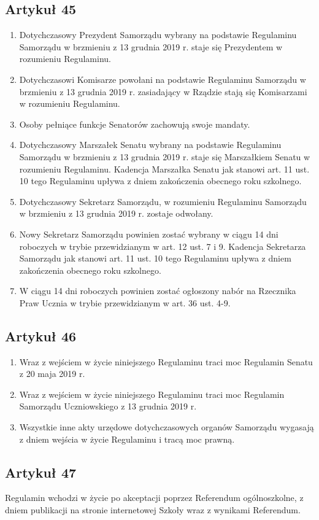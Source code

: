 \documentclass[14pt]{article}
\newenvironment{ustepy}{%
	\begin{enumerate}[leftmargin=1.5em, itemindent=1pt, labelwidth=1em, itemsep=5pt]
	}{%
	\end{enumerate}
}
\begin{document}
\subsection*{Artykuł 45}
\begin{ustepy}
	\item Dotychczasowy Prezydent Samorządu wybrany na podstawie Regulaminu Samorządu w brzmieniu z 13 grudnia 2019 r. staje się Prezydentem w rozumieniu Regulaminu.
	\item Dotychczasowi Komisarze powołani na podstawie Regulaminu Samorządu w brzmieniu z 13 grudnia 2019 r. zasiadający w Rządzie stają się Komisarzami w rozumieniu Regulaminu.
	\item Osoby pełniące funkcje Senatorów zachowują swoje mandaty.
	\item Dotychczasowy Marszałek Senatu wybrany na podstawie Regulaminu Samorządu w brzmieniu z 13 grudnia 2019 r. staje się Marszałkiem Senatu w rozumieniu Regulaminu. Kadencja Marszałka Senatu jak stanowi art. 11 ust. 10 tego Regulaminu upływa z dniem zakończenia obecnego roku szkolnego.
	\item Dotychczasowy Sekretarz Samorządu, w rozumieniu Regulaminu Samorządu w brzmieniu z 13 grudnia 2019 r. zostaje odwołany.
	\item Nowy Sekretarz Samorządu powinien zostać wybrany w ciągu 14 dni roboczych w trybie przewidzianym w art. 12 ust. 7 i 9. Kadencja Sekretarza Samorządu jak stanowi art. 11 ust. 10 tego Regulaminu upływa z dniem zakończenia obecnego roku szkolnego.
	\item W ciągu 14 dni roboczych powinien zostać ogłoszony nabór na Rzecznika Praw Ucznia w trybie przewidzianym w art. 36 ust. 4-9.
\end{ustepy}
\subsection*{Artykuł 46}
\begin{ustepy}
	\item Wraz z wejściem w życie niniejszego Regulaminu traci moc Regulamin Senatu z 20 maja 2019 r.
	\item Wraz z wejściem w życie niniejszego Regulaminu traci moc Regulamin Samorządu Uczniowskiego z 13 grudnia 2019 r.
	\item Wszystkie inne akty urzędowe dotychczasowych organów Samorządu wygasają z dniem wejścia w życie Regulaminu i tracą moc prawną.
\end{ustepy}
\subsection*{Artykuł 47}
Regulamin wchodzi w życie po akceptacji poprzez Referendum ogólnoszkolne, z dniem publikacji na stronie internetowej Szkoły wraz z wynikami Referendum.

	
\end{document}
